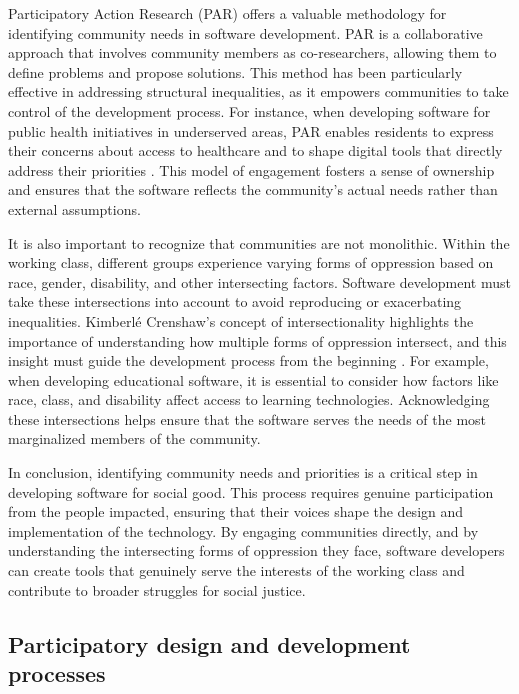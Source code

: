 \begin{refsection}
Participatory Action Research (PAR) offers a valuable methodology for identifying community needs in software development. PAR is a collaborative approach that involves community members as co-researchers, allowing them to define problems and propose solutions. This method has been particularly effective in addressing structural inequalities, as it empowers communities to take control of the development process. For instance, when developing software for public health initiatives in underserved areas, PAR enables residents to express their concerns about access to healthcare and to shape digital tools that directly address their priorities \cite[pp.~142-145]{kemmis2005}. This model of engagement fosters a sense of ownership and ensures that the software reflects the community’s actual needs rather than external assumptions.

It is also important to recognize that communities are not monolithic. Within the working class, different groups experience varying forms of oppression based on race, gender, disability, and other intersecting factors. Software development must take these intersections into account to avoid reproducing or exacerbating inequalities. Kimberlé Crenshaw’s concept of intersectionality highlights the importance of understanding how multiple forms of oppression intersect, and this insight must guide the development process from the beginning \cite[pp.~1241-1243]{crenshaw1989}. For example, when developing educational software, it is essential to consider how factors like race, class, and disability affect access to learning technologies. Acknowledging these intersections helps ensure that the software serves the needs of the most marginalized members of the community.

In conclusion, identifying community needs and priorities is a critical step in developing software for social good. This process requires genuine participation from the people impacted, ensuring that their voices shape the design and implementation of the technology. By engaging communities directly, and by understanding the intersecting forms of oppression they face, software developers can create tools that genuinely serve the interests of the working class and contribute to broader struggles for social justice.

\subsection{Participatory design and development processes}


\end{refsection}
